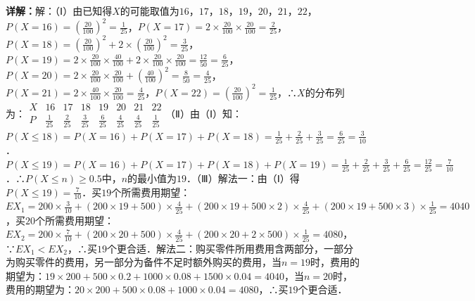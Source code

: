 \begin{question}[points=12]
\begin{solution}
\textbf{详解：}解：（Ⅰ）由已知得$X$的可能取值为$16$，$17$，$18$，$19$，$20$，$21$，$22$，$P(X=16)=(\frac{20}{100})^2=\frac{1}{25}$，$P(X=17)=2\times\frac{20}{100}\times\frac{20}{100}=\frac{2}{25}$，$P(X=18)=(\frac{20}{100})^2+2\times(\frac{20}{100})^2=\frac{3}{25}$，$P(X=19)=2\times\frac{20}{100}\times\frac{40}{100}+2\times\frac{20}{100}\times\frac{20}{100}=\frac{12}{50}=\frac{6}{25}$，$P(X=20)=2\times\frac{20}{100}\times\frac{20}{100}+(\frac{40}{100})^2=\frac{8}{50}=\frac{4}{25}$，$P(X=21)=2\times\frac{40}{100}\times\frac{20}{100}=\frac{4}{25}$，$P(X=22)=(\frac{20}{100})^2=\frac{1}{25}$，∴$X$的分布列为：$\begin{array}{c|ccccccc} X & 16 & 17 & 18 & 19 & 20 & 21 & 22 \\ \hline P & \frac{1}{25} & \frac{2}{25} & \frac{3}{25} & \frac{6}{25} & \frac{4}{25} & \frac{4}{25} & \frac{1}{25} \end{array}$（Ⅱ）由（Ⅰ）知：$P(X\le18)=P(X=16)+P(X=17)+P(X=18)=\frac{1}{25}+\frac{2}{25}+\frac{3}{25}=\frac{6}{25}=\frac{3}{10}$．$P(X\le19)=P(X=16)+P(X=17)+P(X=18)+P(X=19)=\frac{1}{25}+\frac{2}{25}+\frac{3}{25}+\frac{6}{25}=\frac{12}{25}=\frac{7}{10}$．∴$P(X\le n)\ge0.5$中，$n$的最小值为$19$．（Ⅲ）解法一：由（Ⅰ）得$P(X\le19)=\frac{7}{10}$．买$19$个所需费用期望：$EX_1=200\times\frac{3}{10}+(200\times19+500)\times\frac{4}{25}+(200\times19+500\times2)\times\frac{4}{25}+(200\times19+500\times3)\times\frac{1}{25}=4040$，买$20$个所需费用期望：$EX_2=200\times\frac{7}{10}+(200\times20+500)\times\frac{4}{25}+(200\times20+2\times500)\times\frac{1}{25}=4080$，∵$EX_1<EX_2$，∴买$19$个更合适．解法二：购买零件所用费用含两部分，一部分为购买零件的费用，另一部分为备件不足时额外购买的费用，当$n=19$时，费用的期望为：$19\times200+500\times0.2+1000\times0.08+1500\times0.04=4040$，当$n=20$时，费用的期望为：$20\times200+500\times0.08+1000\times0.04=4080$，∴买$19$个更合适．
\end{solution}
\end{question}

